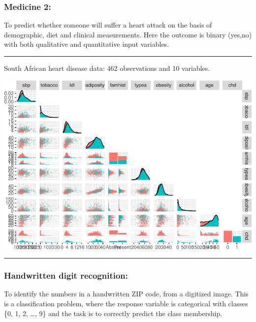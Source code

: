 \documentclass[]{article}
\begin{document}
\hypertarget{medicine-2}{%
\subsubsection{Medicine 2:}\label{medicine-2}}

To predict whether someone will suffer a heart attack on the basis of
demographic, diet and clinical measurements. Here the outcome is binary
({yes},{no}) with both qualitative and quantitative input variables.

\begin{center}\rule{0.5\linewidth}{\linethickness}\end{center}

South African heart disease data: 462 observations and 10 variables.

\includegraphics{2StatLearn_files/figure-latex/heart-1.pdf}

\begin{center}\rule{0.5\linewidth}{\linethickness}\end{center}

\hypertarget{handwritten-digit-recognition}{%
\subsubsection{Handwritten digit
recognition:}\label{handwritten-digit-recognition}}

To identify the numbers in a handwritten ZIP code, from a digitized
image. This is a classification problem, where the response variable is
categorical with classes \{0, 1, 2, \ldots{}, 9\} and the task is to
correctly predict the class membership.
\end{document}
